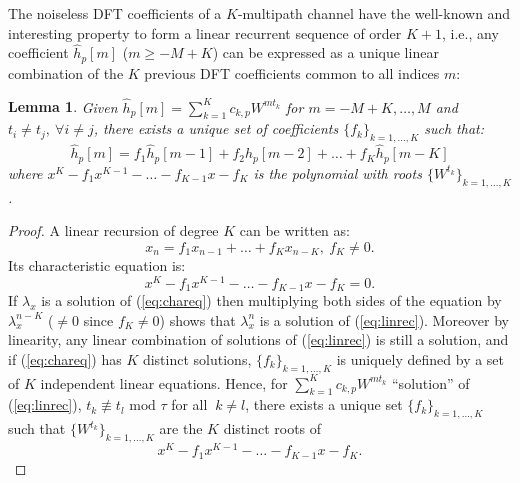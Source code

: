 \documentclass[journal,10pt]{IEEEtran}
\newtheorem{lemma}{Lemma}
\begin{document}
The noiseless DFT coefficients of a $K$-multipath channel have the well-known and interesting property to form a linear recurrent sequence of order $K+1$, i.e., any coefficient $\widehat h_p[m]$ ($m\geq -M+K$) can be expressed as a unique linear combination of the $K$ previous DFT coefficients common to all indices $m$:

\begin{lemma}\label{lemma:recseq}
Given $\widehat{h}_p[m]=\sum_{k=1}^K c_{k,p}W^{mt_k}$ for $m=-M+K,\dots, M$ and $t_i\neq t_j,\ \forall i\neq j$,
there exists  a unique set of coefficients $\lbrace f_k\rbrace_{k=1,\dots,K}$ such that:
$$\widehat{h}_p[m]=f_1\widehat{h}_p[m-1]+f_2\widehat{h}_p[m-2]+\dots+f_K\widehat{h}_p[m-K]$$
where $x^K-f_1x^{K-1}-\dots -f_{K-1}x-f_K$ is the polynomial with roots $\lbrace W^{t_k}\rbrace_{k=1,\dots,K}$.
\end{lemma}
\begin{proof}
A linear recursion of degree $K$ can be written as:
\begin{equation}x_n=f_1x_{n-1}+\dots +f_Kx_{n-K},\ f_K\neq 0.\label{eq:linrec}\end{equation}
Its characteristic equation is:
\begin{equation}x^K-f_1x^{K-1}-\dots -f_{K-1}x-f_K=0.\label{eq:chareq}\end{equation}
If $\lambda_x$ is a solution of (\ref{eq:chareq}) then multiplying both sides of the equation by $\lambda_x^{n-K}$ ($\neq 0$ since $f_K\neq 0$) shows that $\lambda_x^{n}$ is a solution of (\ref{eq:linrec}).
Moreover by linearity, any linear combination of solutions of (\ref{eq:linrec}) is still a solution, and if (\ref{eq:chareq}) has $K$ distinct solutions, $\lbrace f_k\rbrace_{k=1,\dots,K}$ is uniquely defined by a set of $K$ independent linear equations.
Hence, for $\sum_{k=1}^K c_{k,p}W^{mt_k}$ ``solution'' of (\ref{eq:linrec}), $t_k\not\equiv t_l \text{ mod }\tau$ for all $\ k\neq l$, there exists a unique set $\lbrace f_k\rbrace_{k=1,\dots,K}$ such that $\lbrace W^{t_k}\rbrace_{k=1,\dots,K}$ are the $K$ distinct roots of
$$x^K-f_1x^{K-1}-\dots -f_{K-1}x-f_K.$$
\end{proof}
\end{document}
